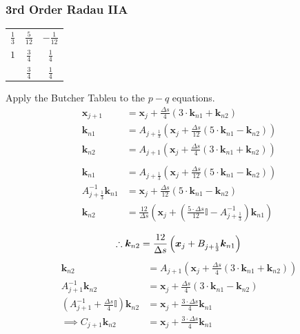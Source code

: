 \documentclass{article}
\begin{document}
\subsubsection{3rd Order Radau  IIA}
\begin{center}
  \begin{tabular}{c|c c}
    $\frac{1}{3}$ & $\frac{5}{12}$ & $-\frac{1}{12}$ \\
    $1$ & $\frac{3}{4}$ & $\frac{1}{4}$ \\
    \hline
                & $\frac{3}{4}$ & $\frac{1}{4}$
  \end{tabular}
\end{center}
Apply the Butcher Tableu to the $p-q$ equations.
\begin{align*}
  \bm{x}_{j+1} &= \bm{x}_j + \frac{\Delta s}{4}\left(3\cdot\bm{k}_{n1} + \bm{k}_{n2} \right)\\
  \bm{k}_{n1} &= A_{j+\frac{1}{3}}\left(\bm{x}_{j} +\frac{\Delta s}{12} \left( 5\cdot\bm{k}_{n1} - \bm{k}_{n2}\right)\right)\\
  \bm{k}_{n2} &= A_{j+1}\left(\bm{x}_{j} +\frac{\Delta s}{4} \left( 3\cdot\bm{k}_{n1} + \bm{k}_{n2}\right)\right)\\
  \\
  \bm{k}_{n1} &= A_{j+\frac{1}{3}}\left(\bm{x}_{j} +\frac{\Delta s}{12} \left( 5\cdot\bm{k}_{n1} - \bm{k}_{n2}\right)\right)\\
  A_{j+\frac{1}{3}}^{-1}\bm{k}_{n1} &= \bm{x}_{j} + \frac{\Delta s}{12} \left( 5\cdot\bm{k}_{n1} - \bm{k}_{n2}\right)\\
  \bm{k}_{n2} &= \frac{12}{\Delta s}\left(\bm{x}_j + \left( \frac{5\cdot\Delta s}{12}\mathbb{I} - A_{j+\frac{1}{3}}^{-1}\right)\bm{k}_{n1}\right)\\
\end{align*}
\begin{equation}
  \label{eq:Radau3IIAkn2side1}
  \therefore \bm{k}_{n2} = \frac{12}{\Delta s}\left(\bm{x}_j + B_{j+\frac{1}{3}}\bm{k}_{n1}\right)\\
\end{equation}
\begin{align*}
  \bm{k}_{n2} &= A_{j+1}\left(\bm{x}_{j} +\frac{\Delta s}{4} \left( 3\cdot\bm{k}_{n1} + \bm{k}_{n2}\right)\right)\\
  A_{j+1}^{-1}\bm{k}_{n2} &= \bm{x}_j + \frac{\Delta s}{4}\left(3\cdot\bm{k}_{n1} - \bm{k}_{n2}\right)\\
  \left(A_{j+1}^{-1} + \frac{\Delta s}{4}\mathbb{I}\right)\bm{k}_{n2} &= \bm{x}_j + \frac{3\cdot\Delta s}{4}\bm{k}_{n1}\\
  \implies C_{j+1}\bm{k}_{n2} &= \bm{x}_j + \frac{3\cdot \Delta s}{4}\bm{k}_{n1}\\
\end{align*}
\end{document}
